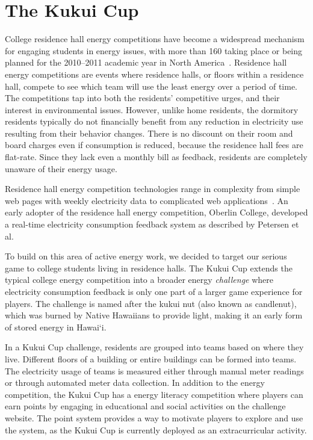 \documentclass[10pt, conference, compsocconf]{IEEEtran-old}
\newcommand{\Hawaii}{Hawai`i\xspace}
\begin{document}
\section{The Kukui Cup}

College residence hall energy competitions have become a widespread mechanism for engaging students in energy issues, with more than 160 taking place or being planned for the 2010--2011 academic year in North America~\cite{Hodge2010}. Residence hall energy competitions are events where residence halls, or floors within a residence hall, compete to see which team will use the least energy over a period of time. The competitions tap into both the residents' competitive urges, and their interest in environmental issues. However, unlike home residents, the dormitory residents typically do not financially benefit from any reduction in electricity use resulting from their behavior changes. There is no discount on their room and board charges even if consumption is reduced, because the residence hall fees are flat-rate. Since they lack even a monthly bill as feedback, residents are completely unaware of their energy usage.

Residence hall energy competition technologies range in complexity from simple web pages with weekly electricity data to complicated web applications~\cite[pp. 6--11]{csdl2-11-01}. An early adopter of the residence hall energy competition, Oberlin College, developed a real-time electricity consumption feedback system as described by Petersen et al.~\cite{petersen-dorm-energy-reduction}

To build on this area of active energy work, we decided to target our serious game to college students living in residence halls. The Kukui Cup extends the typical college energy competition into a broader energy \emph{challenge} where electricity consumption feedback is only one part of a larger game experience for players. The challenge is named after the kukui nut (also known as candlenut), which was burned by Native Hawaiians to provide light, making it an early form of stored energy in \Hawaii.

In a Kukui Cup challenge, residents are grouped into teams based on where they live. Different floors of a building or entire buildings can be formed into teams. The electricity usage of teams is measured either through manual meter readings or through automated meter data collection. In addition to the energy competition, the Kukui Cup has a energy literacy competition where players can earn points by engaging in educational and social activities on the challenge website. The point system provides a way to motivate players to explore and use the system, as the Kukui Cup is currently deployed as an extracurricular activity.
\end{document}
